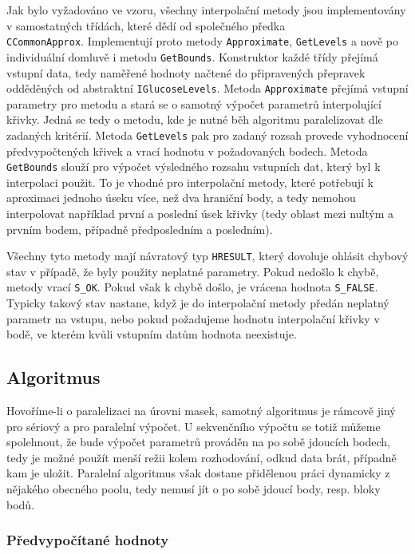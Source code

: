 \documentclass[]{thesiskiv}
\begin{document}
Jak bylo vyžadováno ve vzoru, všechny interpolační metody jsou implementovány v samostatných třídách, které dědí od společného předka\\ \texttt{CCommonApprox}. Implementují proto metody \texttt{Approximate}, \texttt{GetLevels} a nově po individuální domluvě i metodu \texttt{GetBounds}. Konstruktor každé třídy přejímá vstupní data, tedy naměřené hodnoty načtené do připravených přepravek odděděných od abstraktní \texttt{IGlucoseLevels}. Metoda \texttt{Approximate} přejímá vstupní parametry pro metodu a stará se o samotný výpočet parametrů interpolující křivky. Jedná se tedy o metodu, kde je nutné běh algoritmu paralelizovat dle zadaných kritérií. Metoda \texttt{GetLevels} pak pro zadaný rozsah provede vyhodnocení předvypočtených křivek a vrací hodnotu v požadovaných bodech. Metoda \texttt{GetBounds} slouží pro výpočet výsledného rozsahu vstupních dat, který byl k interpolaci použit. To je vhodné pro interpolační metody, které potřebují k aproximaci jednoho úseku více, než dva hraniční body, a tedy nemohou interpolovat například první a poslední úsek křivky (tedy oblast mezi nultým a prvním bodem, případně předposledním a posledním).

Všechny tyto metody mají návratový typ \texttt{HRESULT}, který dovoluje ohlásit chybový stav v případě, že byly použity neplatné parametry. Pokud nedošlo k chybě, metody vrací \texttt{S\_OK}. Pokud však k chybě došlo, je vrácena hodnota \texttt{S\_FALSE}. Typicky takový stav nastane, když je do interpolační metody předán neplatný parametr na vstupu, nebo pokud požadujeme hodnotu interpolační křivky v bodě, ve kterém kvůli vstupním datům hodnota neexistuje.

\subsection{Algoritmus}\label{algo:impl}

Hovoříme-li o paralelizaci na úrovni masek, samotný algoritmus je rámcově jiný pro sériový a pro paralelní výpočet. U sekvenčního výpočtu se totiž můžeme spolehnout, že bude výpočet parametrů prováděn na po sobě jdoucích bodech, tedy je možné použít menší režii kolem rozhodování, odkud data brát, případně kam je uložit. Paralelní algoritmus však dostane přidělenou práci dynamicky z nějakého obecného poolu, tedy nemusí jít o po sobě jdoucí body, resp. bloky bodů.

\subsubsection*{Předvypočítané hodnoty}
\end{document}

